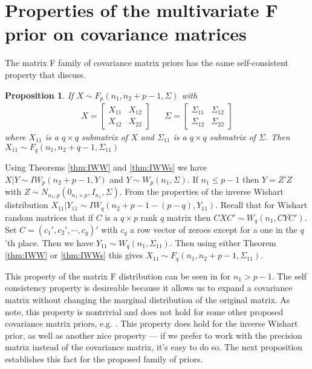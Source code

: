 \documentclass{article}\usepackage[]{graphicx}\usepackage[]{color}
\newtheorem{prop}[thm]{Proposition}
\begin{document}
\section{Properties of the multivariate F prior on covariance matrices}\label{sec:priorprop}
The matrix F family of covariance matrix priors has the same self-consistent property that \cite{huang2013simple} discuss.
\begin{prop}\label{prop:selfcons}
If $X\sim F_p(n_1, n_2 + p - 1, \Sigma)$ with
\begin{align*}
  X = \begin{bmatrix} X_{11} & X_{12} \\ X_{12} & X_{22} \end{bmatrix} &&   \Sigma = \begin{bmatrix} \Sigma_{11} & \Sigma_{12} \\ \Sigma_{12} & \Sigma_{22} \end{bmatrix}
\end{align*}
where $X_{11}$ is a $q\times q$ submatrix of $X$ and $\Sigma_{11}$ is a $q\times q$ submatrix of $\Sigma$. Then $X_{11} \sim F_q(n_1, n_2 + q - 1, \Sigma_{11})$ 
\end{prop}
Using Theorems \eqref{thm:IWW} and \eqref{thm:IWWs} we have $X|Y \sim IW_p(n_2 + p - 1, Y)$ and $Y \sim W_p(n_1, \Sigma)$. If $n_1\leq p-1$ then $Y=Z'Z$ with $Z\sim N_{n_1,p}(0_{n_1\times p},I_{n_1},\Sigma)$. From the properties of the inverse Wishart distribution $X_{11}|Y_{11}\sim IW_q(n_2 + p - 1 - (p-q), Y_{11})$. Recall that for Wishart random matrices that if $C$ is a $q\times p$ rank $q$ matrix then $CX C'\sim W_q(n_1,CYC')$. Set $C=(c_1',c_2',\cdots,c_q)'$ with $c_q$ a row vector of zeroes except for a one in the $q$'th place. Then we have $Y_{11}\sim W_q(n_1,\Sigma_{11})$. Then using either Theorem \eqref{thm:IWW} or \eqref{thm:IWWs} this gives $X_{11}\sim F_q(n_1, n_2 + p - 1, \Sigma_{11})$.

This property of the matrix F distribution can be seen in \citet{dawid1981some} for $n_1 > p - 1$. The self consistency property is desireable because it allows us to expand a covariance matrix without changing the marginal distribution of the original matrix. As \citet{huang2013simple} note, this property is nontrivial and does not hold for some other proposed covariance matrix priors, e.g. \cite{barnard2000modeling}. This property does hold for the inverse Wishart prior, as well as another nice property --- if we prefer to work with the precision matrix instead of the covariance matrix, it's easy to do so. The next proposition establishes this fact for the proposed family of priors.
\end{document}
